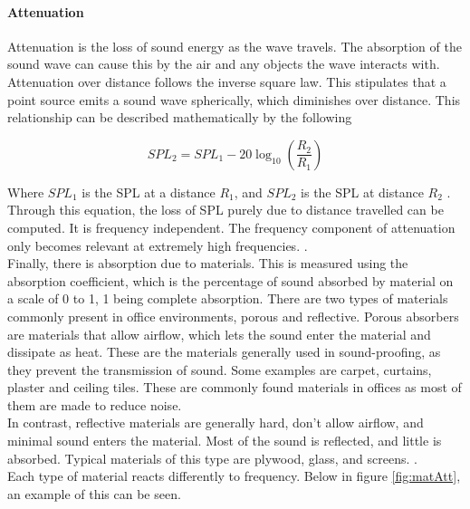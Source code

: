 \paragraph{Attenuation}

Attenuation is the loss of sound energy as the wave travels. The absorption of the sound wave can cause this by the air and any objects the wave interacts with. \\

Attenuation over distance follows the inverse square law. This stipulates that a point source emits a sound wave spherically, which diminishes over distance. This relationship can be described mathematically by the following 

\begin{equation}
SPL_{2} = SPL_{1}-20\log_{10}\left(\frac{R_{2}}{R_{1}}\right)
\end{equation}


Where \( SPL_{1}\) is the SPL at a distance \( R_{1}\), and \( SPL_{2}\) is the SPL at distance \( R_{2}\)  \cite{invLaw}. Through this equation, the loss of SPL purely due to distance travelled can be computed. It is frequency independent. The frequency component of attenuation only becomes relevant at extremely high frequencies. \cite{int93}. \\

Finally, there is absorption due to materials. This is measured using the absorption coefficient, which is the percentage of sound absorbed by material on a scale of 0 to 1, 1 being complete absorption. There are two types of materials commonly present in office environments, porous and reflective. Porous absorbers are materials that allow airflow, which lets the sound enter the material and dissipate as heat. These are the materials generally used in sound-proofing, as they prevent the transmission of sound. Some examples are carpet, curtains, plaster and ceiling tiles. These are commonly found materials in offices as most of them are made to reduce noise. \\

In contrast, reflective materials are generally hard, don’t allow airflow, and minimal sound enters the material. Most of the sound is reflected, and little is absorbed. Typical materials of this type are plywood, glass, and screens.  \cite{soundAtt}. \\

Each type of material reacts differently to frequency. Below in figure \ref{fig:matAtt}, an example of this can be seen. 

